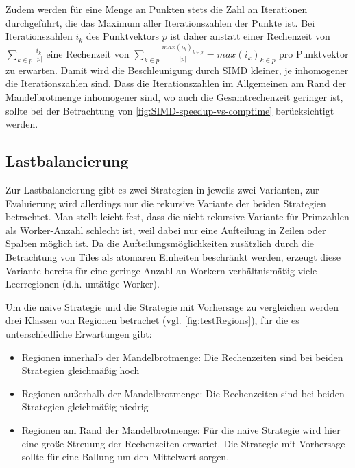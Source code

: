 Zudem werden für eine Menge an Punkten stets die Zahl an Iterationen durchgeführt,
die das Maximum aller Iterationszahlen der Punkte ist.
Bei Iterationszahlen \(i_k\) des Punktvektors \(p\) ist daher
anstatt einer Rechenzeit von \(\sum_{k \in p} \frac{i_k }{ | p | }\) eine Rechenzeit von
\(\sum_{k \in p} \frac{max(i_k)_{k \in p }}{|p|} = max(i_k)_{k \in p }\) pro Punktvektor zu erwarten.
Damit wird die Beschleunigung durch SIMD kleiner, je inhomogener die Iterationszahlen sind.
Dass die Iterationszahlen im Allgemeinen am Rand der Mandelbrotmenge inhomogener sind,
wo auch die Gesamtrechenzeit geringer ist, sollte bei der Betrachtung von \autoref{fig:SIMD-speedup-vs-comptime} berücksichtigt werden.


\subsection{Lastbalancierung}
Zur Lastbalancierung gibt es zwei Strategien in jeweils zwei Varianten, zur Evaluierung wird allerdings nur die rekursive Variante der beiden Strategien betrachtet.
Man stellt leicht fest, dass die nicht-rekursive Variante für Primzahlen als Worker-Anzahl schlecht ist, weil dabei nur eine Aufteilung in Zeilen oder Spalten möglich ist.
Da die Aufteilungsmöglichkeiten zusätzlich durch die Betrachtung von Tiles als atomaren Einheiten beschränkt werden, erzeugt diese Variante bereits für eine geringe Anzahl an Workern verhältnismäßig viele Leerregionen (d.h. untätige Worker).

Um die naive Strategie und die Strategie mit Vorhersage zu vergleichen werden drei Klassen von Regionen betrachet (vgl. \autoref{fig:testRegions}), für die es unterschiedliche Erwartungen gibt:

\begin{itemize}
	\item Regionen innerhalb der Mandelbrotmenge: Die Rechenzeiten sind bei beiden Strategien gleichmäßig hoch
	\item Regionen außerhalb der Mandelbrotmenge: Die Rechenzeiten sind bei beiden Strategien gleichmäßig niedrig
	\item Regionen am Rand der Mandelbrotmenge: Für die naive Strategie wird hier eine große Streuung der Rechenzeiten erwartet. Die Strategie mit Vorhersage sollte für eine Ballung um den Mittelwert sorgen.
\end{itemize}

